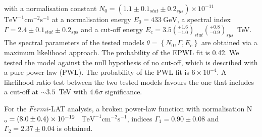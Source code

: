 \documentclass{PoS}
\newcommand{\Revision}[1]{\textbf{#1}}
\begin{document}
with a normalisation constant $N_0=(1.1 \pm 0.1_{\textit{stat}} \pm 0.2_{\textit{sys}}) \times 10^{-11}$~$\text{TeV}^{-1} \text{cm}^{-2} \text{s}^{-1}$ at a normalisation energy $E_0 = 433~\text{GeV}$, a spectral index $\Gamma = 2.4 \pm 0.1_{\textit{stat}} \pm 0.2_{\textit{sys}}$ and a cut-off energy $E_c = 3.5\left(^{+1.6}_{-1.0}\right)_{\textit{stat}} \left(^{+0.8}_{-0.9}\right)_{\textit{sys}}$~TeV. The spectral parameters of the tested models $\theta=\left\lbrace N_0,\Gamma,E_c \right\rbrace$ are obtained via a maximum likelihood approach.
The probability of the EPWL fit is 0.42. We tested the model against the null hypothesis of no cut-off, which is described with a pure power-law (PWL). The probability of the PWL fit is $6 \times 10^{-4}$. A likelihood ratio test between the two tested models favours the one that includes a cut-off at $\sim3.5$~TeV with 4.6$\sigma$ significance.


For the $Fermi$-LAT analysis, a broken power-law function with normalisation N$_{\rm o}=(8.0\pm0.4)\times10^{-12}$~ $\text{TeV}^{-1} \text{cm}^{-2} \text{s}^{-1}$, indices ${\Gamma_1=0.90\pm0.08}$ and ${\Gamma_2=2.37\pm0.04}$ is obtained.
\end{document}
